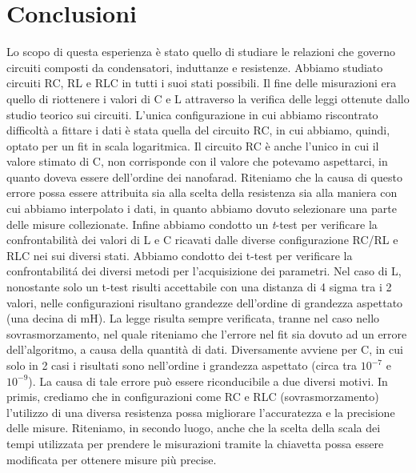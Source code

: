 \section{Conclusioni}
Lo scopo di questa esperienza è stato quello di studiare le relazioni che governo circuiti composti da condensatori, induttanze e resistenze. Abbiamo studiato circuiti RC, RL e RLC in tutti i suoi stati possibili. Il fine delle misurazioni era quello di riottenere i valori di C e L attraverso la verifica delle leggi ottenute dallo studio teorico sui circuiti. L'unica configurazione in cui abbiamo riscontrato difficoltà a fittare i dati è stata quella del circuito RC, in cui abbiamo, quindi, optato per un fit in scala logaritmica. Il circuito RC è anche l'unico in cui il valore stimato di C, non corrisponde con il valore che potevamo aspettarci, in quanto doveva essere dell'ordine dei nanofarad. Riteniamo che la causa di questo errore possa essere attribuita sia alla scelta della resistenza sia alla maniera con cui abbiamo interpolato i dati, in quanto abbiamo dovuto selezionare una parte delle misure collezionate. Infine abbiamo condotto un \textit{t}-test per verificare la confrontabilità dei valori di L e C ricavati dalle diverse configurazione RC/RL e RLC nei sui diversi stati.
Abbiamo condotto dei t-test per verificare la confrontabilitá dei diversi metodi per l'acquisizione dei parametri. Nel caso di L, nonostante solo un t-test risulti accettabile con una distanza di 4 sigma tra i 2 valori, nelle configurazioni risultano grandezze dell'ordine di grandezza aspettato (una decina di mH). La legge risulta sempre verificata, tranne nel caso nello sovrasmorzamento, nel quale riteniamo che l'errore nel fit sia dovuto ad un errore dell'algoritmo, a causa della quantità di dati.
Diversamente avviene per C, in cui solo in 2 casi i risultati sono nell'ordine i grandezza aspettato (circa tra $10^{-7}$ e $10^{-9}$). La causa di tale errore può essere riconducibile a due diversi motivi. In primis, crediamo che in configurazioni come RC e RLC (sovrasmorzamento) l'utilizzo di una diversa resistenza possa migliorare l'accuratezza e la precisione delle misure. Riteniamo, in secondo luogo, anche che la scelta della scala dei tempi utilizzata per prendere le misurazioni tramite la chiavetta possa essere modificata per ottenere misure più precise.